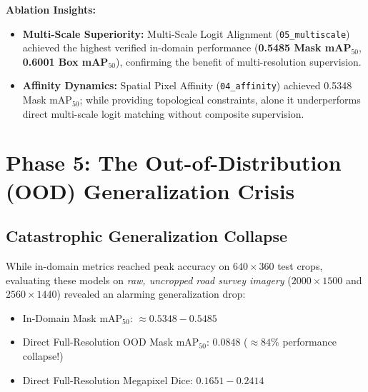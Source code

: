 \documentclass[11pt,a4paper]{article}
\begin{document}
\noindent\textbf{Ablation Insights:}
\begin{itemize}[leftmargin=1.5em]
  \item \textbf{Multi-Scale Superiority:} Multi-Scale Logit Alignment (\texttt{05\_multiscale}) achieved the highest verified in-domain performance (\textbf{0.5485 Mask mAP$_{50}$}, \textbf{0.6001 Box mAP$_{50}$}), confirming the benefit of multi-resolution supervision.
  \item \textbf{Affinity Dynamics:} Spatial Pixel Affinity (\texttt{04\_affinity}) achieved 0.5348 Mask mAP$_{50}$; while providing topological constraints, alone it underperforms direct multi-scale logit matching without composite supervision.
\end{itemize}

\section{Phase 5: The Out-of-Distribution (OOD) Generalization Crisis}
\label{sec:phase5}

\subsection{Catastrophic Generalization Collapse}
While in-domain metrics reached peak accuracy on $640\times360$ test crops, evaluating these models on \emph{raw, uncropped road survey imagery} ($2000\times1500$ and $2560\times1440$) revealed an alarming generalization drop:
\begin{itemize}[leftmargin=1.5em]
  \item In-Domain Mask mAP$_{50}$: $\approx 0.5348 - 0.5485$
  \item Direct Full-Resolution OOD Mask mAP$_{50}$: $\mathbf{0.0848}$ ($\approx 84\%$ performance collapse!)
  \item Direct Full-Resolution Megapixel Dice: $\mathbf{0.1651 - 0.2414}$
\end{itemize}
\end{document}
